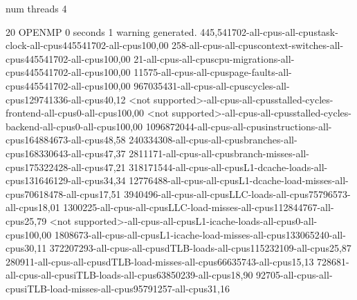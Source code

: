 num threads 4

20
OPENMP
0 seconds
1 warning generated.
445,541702-all-cpus-all-cpustask-clock-all-cpus445541702-all-cpus100,00
258-all-cpus-all-cpuscontext-switches-all-cpus445541702-all-cpus100,00
21-all-cpus-all-cpuscpu-migrations-all-cpus445541702-all-cpus100,00
11575-all-cpus-all-cpuspage-faults-all-cpus445541702-all-cpus100,00
967035431-all-cpus-all-cpuscycles-all-cpus129741336-all-cpus40,12
<not supported>-all-cpus-all-cpusstalled-cycles-frontend-all-cpus0-all-cpus100,00
<not supported>-all-cpus-all-cpusstalled-cycles-backend-all-cpus0-all-cpus100,00
1096872044-all-cpus-all-cpusinstructions-all-cpus164884673-all-cpus48,58
240334308-all-cpus-all-cpusbranches-all-cpus168330643-all-cpus47,37
2811171-all-cpus-all-cpusbranch-misses-all-cpus175322428-all-cpus47,21
318171544-all-cpus-all-cpusL1-dcache-loads-all-cpus131646129-all-cpus34,34
12776488-all-cpus-all-cpusL1-dcache-load-misses-all-cpus70618478-all-cpus17,51
3940496-all-cpus-all-cpusLLC-loads-all-cpus75796573-all-cpus18,01
1300225-all-cpus-all-cpusLLC-load-misses-all-cpus112844767-all-cpus25,79
<not supported>-all-cpus-all-cpusL1-icache-loads-all-cpus0-all-cpus100,00
1808673-all-cpus-all-cpusL1-icache-load-misses-all-cpus133065240-all-cpus30,11
372207293-all-cpus-all-cpusdTLB-loads-all-cpus115232109-all-cpus25,87
280911-all-cpus-all-cpusdTLB-load-misses-all-cpus66635743-all-cpus15,13
728681-all-cpus-all-cpusiTLB-loads-all-cpus63850239-all-cpus18,90
92705-all-cpus-all-cpusiTLB-load-misses-all-cpus95791257-all-cpus31,16
